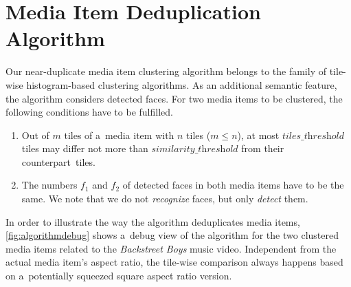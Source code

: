 \documentclass{article}
\begin{document}
\section{Media Item Deduplication Algorithm}
\label{sec:media-item-deduplication-algorithm}

Our near-duplicate media item clustering algorithm belongs to the family of
tile-wise histogram-based clustering algorithms.
As an additional semantic feature, the algorithm considers detected faces.
For two media items to be clustered,
the following conditions have to be fulfilled.

\begin{enumerate}
  \item Out of $m$ tiles of a~media item with $n$ tiles ($m \leq n$),
    at most $\textit{tiles\_threshold}$ tiles may differ not more than $\textit{similarity\_threshold}$
    from their counterpart~tiles.
  \item The numbers $f_1$ and $f_2$ of detected faces in both media items
    have to be the same.
    We note that we do not \emph{recognize} faces, but only \emph{detect} them.
\end{enumerate}

In order to illustrate the way the algorithm deduplicates media items,
\autoref{fig:algorithmdebug} shows a~debug view of the algorithm
for the two clustered media items related to the 
\emph{Backstreet Boys} music video.
Independent from the actual media item's aspect ratio,
the tile-wise comparison always happens based on a~potentially squeezed
square aspect ratio version.

\begin{figure}[b!]
  \centering
  \caption{}
  \label{fig:algorithmdebug}  
\end{figure}




\end{document}
